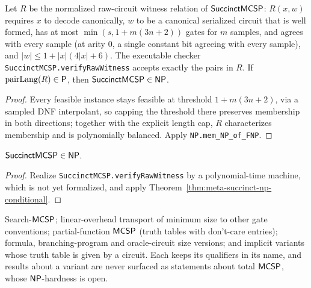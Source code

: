 \begin{theorem}
  \label{thm:meta-succinct-np-conditional}
  \leanok
  Let $R$ be the normalized raw-circuit witness relation of
  $\mathsf{SuccinctMCSP}$: $R(x, w)$ requires $x$ to decode canonically, $w$ to be
  a canonical serialized circuit that is well formed, has at most
  $\min(s, 1 + m(3n+2))$ gates for $m$ samples, and agrees with every sample
  (at arity $0$, a single constant bit agreeing with every sample), and
  $|w| \le 1 + |x|(4|x|+6)$. The executable checker
  \texttt{SuccinctMCSP.verifyRawWitness} accepts exactly the pairs in $R$. If
  $\mathrm{pairLang}(R) \in \mathsf{P}$, then $\cc{SuccinctMCSP} \in \cc{NP}$.
\end{theorem}
\begin{proof}
  \leanok
  Every feasible instance stays feasible at threshold $1 + m(3n+2)$, via a
  sampled DNF interpolant, so capping the threshold there preserves
  membership in both directions; together with
  the explicit length cap, $R$ characterizes membership and is polynomially
  balanced. Apply \texttt{NP.mem\_NP\_of\_FNP}.
\end{proof}

\begin{theorem}[$\cc{SuccinctMCSP} \in \cc{NP}$]
  \label{thm:meta-succinct-np}
  $\cc{SuccinctMCSP} \in \cc{NP}$.
\end{theorem}
\begin{proof}
  Realize \texttt{SuccinctMCSP.verifyRawWitness} by a polynomial-time machine,
  which is not yet formalized, and apply
  Theorem~\ref{thm:meta-succinct-np-conditional}.
\end{proof}

\begin{definition}
  \label{def:meta-mcsp-variants}
  Search-$\mathsf{MCSP}$; linear-overhead transport of minimum size to other gate
  conventions; partial-function $\mathsf{MCSP}$ (truth tables with don't-care
  entries); formula, branching-program and oracle-circuit size versions; and
  implicit variants whose truth table is given by a circuit. Each keeps its
  qualifiers in its name, and results about a variant are never surfaced as
  statements about total $\mathsf{MCSP}$, whose $\mathsf{NP}$-hardness is open.
\end{definition}

